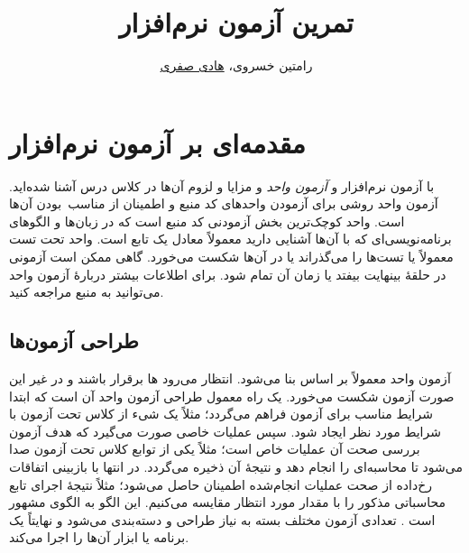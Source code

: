 \documentclass{utap}
\title{تمرین آزمون نرم‌افزار}
\author{رامتین خسروی، \href{mailto:hadi.safari@ut.ac.ir?subject=[AP\%20S98 A3]\%20}{هادی صفری}}
\begin{document}
    \maketitle

    \section{مقدمه‌ای بر آزمون نرم‌افزار}

    با آزمون نرم‌افزار و \textit{آزمون واحد} و مزایا و لزوم آن‌ها در کلاس درس آشنا شده‌اید. آزمون واحد روشی  برای آزمودن واحدهای کد منبع و اطمینان از مناسب~بودن آن‌ها است. واحد کوچک‌ترین بخش آزمودنی کد منبع است که در زبان‌ها و الگوهای برنامه‌نویسی‌ای که با آن‌ها آشنایی دارید معمولاً معادل یک تابع است.
    واحد تحت تست معمولاً یا تست‌ها را می‌گذراند یا در آن‌ها شکست می‌خورد. گاهی ممکن است آزمونی در حلقهٔ بینهایت بیفتد یا زمان آن تمام شود.
    برای اطلاعات بیشتر دربارهٔ آزمون واحد می‌توانید به منبع \cite{wikibooks18} مراجعه کنید.

    \subsection{طراحی آزمون‌ها}

    آزمون واحد معمولاً بر اساس  بنا می‌شود. انتظار می‌رود ها برقرار باشند و در غیر این صورت آزمون شکست می‌خورد.
    یک راه معمول طراحی آزمون واحد آن است که ابتدا شرایط مناسب برای آزمون فراهم می‌گردد؛ مثلاً یک شیء از کلاس تحت آزمون با شرایط مورد نظر ایجاد شود. سپس عملیات خاصی صورت می‌گیرد که هدف آزمون بررسی صحت آن عملیات خاص است؛ مثلاً یکی از توابع کلاس تحت آزمون صدا می‌شود تا محاسبه‌ای را انجام دهد و نتیجهٔ آن ذخیره می‌گردد. در انتها با بازبینی اتفاقات رخ‌داده از صحت عملیات انجام‌شده اطمینان حاصل می‌شود؛ مثلاً نتیجهٔ اجرای تابع محاسباتی مذکور را با مقدار مورد انتظار مقایسه می‌کنیم. این الگو به الگوی  مشهور است \cite{dietrich14,vocke18}. تعدادی آزمون مختلف بسته به نیاز طراحی و دسته‌بندی می‌شود و نهایتاً یک برنامه یا ابزار آن‌ها را اجرا می‌کند.
\end{document}
